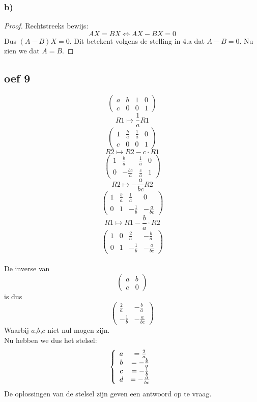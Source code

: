 \documentclass[10pt,a4paper]{article}
\begin{document}
\subsubsection*{b)}
\begin{proof}
Rechtstreeks bewijs:\\
\[
AX=BX \Leftrightarrow AX - BX=0
\]
Dus $(A-B)X=0$.
Dit betekent volgens de stelling in 4.a dat $A-B=0$.
Nu zien we dat $A=B$.
\end{proof}

\subsection*{oef 9}
\[
\begin{pmatrix}
a & b & 1 & 0\\
c & 0 & 0 & 1
\end{pmatrix}
\]
\[ R1 \longmapsto \frac{1}{a} R1 \]
\[
\begin{pmatrix}
1 & \frac{b}{a} & \frac{1}{a} & 0\\
c & 0 & 0 & 1
\end{pmatrix}
\]
\[ R2 \longmapsto R2 - c \cdot R1\]
\[
\begin{pmatrix}
1 & \frac{b}{a} & \frac{1}{a} & 0\\
0 & -\frac{bc}{a} & \frac{c}{a} & 1
\end{pmatrix}
\]
\[ R2 \longmapsto -\frac{a}{bc} R2 \]
\[
\begin{pmatrix}
1 & \frac{b}{a} & \frac{1}{a} & 0\\
0 & 1 & -\frac{1}{b} & -\frac{a}{bc}
\end{pmatrix}
\]
\[ R1 \longmapsto R1 - \frac{b}{a} \cdot R2\]
\[
\begin{pmatrix}
1 & 0 & \frac{2}{a} & -\frac{b}{a}\\
0 & 1 & -\frac{1}{b} & -\frac{a}{bc}
\end{pmatrix}
\]
\\De inverse van 
\[
\begin{pmatrix}
a & b\\
c & 0
\end{pmatrix}
\]
is dus
\[
\begin{pmatrix}
\frac{2}{a} & -\frac{b}{a}\\
-\frac{1}{b} & -\frac{a}{bc}
\end{pmatrix}
\]
Waarbij $a$,$b$,$c$ niet nul mogen zijn.\\
Nu hebben we dus het stelsel:
\[
\left\lbrace
\begin{array}{c c}
a &= \frac{2}{a}\\
b &= -\frac{b}{a}\\
c &= -\frac{1}{b}\\
d &= -\frac{a}{bc}
\end{array}
\right.
\]
De oplossingen van de stelsel zijn geven een antwoord op te vraag.
\end{document}
